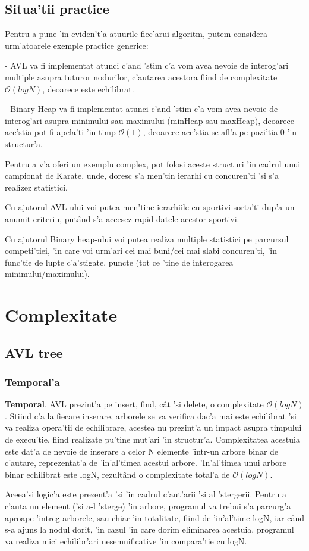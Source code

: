 \documentclass[titlepage,12pt]{article}
\numberwithin{figure}{section}
\begin{document}
\subsection{Situa'tii practice} 
Pentru a pune 'in eviden't'a atuurile fiec'arui algoritm, putem considera urm'atoarele exemple practice generice:
	\par - AVL va fi implementat atunci c'and 'stim c'a vom avea nevoie de interog'ari multiple asupra tuturor nodurilor, c'autarea acestora fiind de complexitate $\mathcal{O}(log N)$, deoarece este echilibrat.
	\par - Binary Heap va fi implementat atunci c'and 'stim c'a vom avea nevoie de interog'ari asupra minimului sau maximului (minHeap sau maxHeap), deoarece ace'stia pot fi apela'ti 'in timp $\mathcal{O}(1)$, deoarece ace'stia se afl'a pe pozi'tia 0 'in structur'a.
	\\ \par Pentru a v'a oferi un exemplu complex, pot folosi aceste structuri 'in cadrul unui campionat de Karate, unde, doresc s'a men'tin ierarhi cu concuren'ti 'si s'a realizez statistici.
	\par Cu ajutorul AVL-ului voi putea men'tine ierarhiile cu sportivi sorta'ti dup'a un anumit criteriu, put\^and s'a accesez rapid datele acestor sportivi.
	\par Cu ajutorul Binary heap-ului voi putea realiza multiple statistici pe parcursul competi'tiei, 'in care voi urm'ari cei mai buni/cei mai slabi concuren'ti, 'in func'tie de lupte c'a'stigate, puncte (tot ce 'tine de interogarea minimului/maximului).
	
\section{Complexitate}	
\subsection{AVL tree}
\subsubsection{Temporal'a}
\textbf{Temporal}, AVL prezint'a pe insert, find, c\^at 'si delete, o complexitate  $\mathcal{O}(log N)$. Stiind c'a la fiecare inserare, arborele se va verifica dac'a mai este echilibrat 'si va realiza opera'tii de echilibrare, acestea nu prezint'a un impact asupra timpului de execu'tie, fiind realizate pu'tine mut'ari 'in structur'a. Complexitatea acestuia este dat'a de nevoie de inserare a celor N elemente 'intr-un arbore binar de c'autare, reprezentat'a de 'in'al'timea acestui arbore. 'In'al'timea unui arbore binar echilibrat este logN, rezult\^and o complexitate total'a de  $\mathcal{O}(log N)$. 
\par Aceea'si logic'a este prezent'a 'si 'in cadrul c'aut'arii 'si al 'stergerii. Pentru a c'auta un element ('si a-l 'sterge) 'in arbore, programul va trebui s'a parcurg'a aproape 'intreg arborele, sau chiar 'in totalitate, fiind de 'in'al'time logN, iar c\^and s-a ajuns la nodul dorit, 'in cazul 'in care dorim eliminarea acestuia, programul va realiza mici echilibr'ari nesemnificative 'in compara'tie cu logN.
\end{document}
